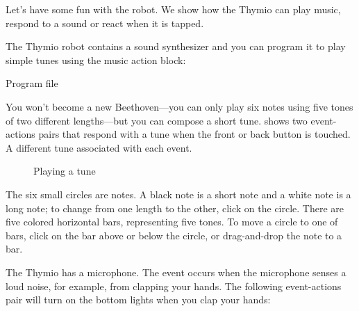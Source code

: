 \label{ch.bells}

Let's have some fun with the robot. We show how the Thymio can play
music, respond to a sound or react when it is tapped.


The Thymio robot contains a sound synthesizer and you can program it
to play simple tunes using the music action block: 

{\raggedleft \hfill Program file }

You won't become a new Beethoven---you can only play six notes using
five tones of two different lengths---but you can compose a short tune.
 shows two event-actions pairs that respond with a tune
when the front or back button is touched. A different tune associated
with each event.

\begin{figure}
\begin{center}
\caption{Playing a tune}\label{fig.music}
\end{center}
\end{figure}

The six small circles are notes. A black note is a short note and a
white note is a long note; to change from one length to the other, click
on the circle. There are five colored horizontal bars, representing five
tones. To move a circle to one of bars, click on the bar above or
below the circle, or drag-and-drop the note to a bar.




The Thymio has a microphone. The event  occurs
when the microphone senses a loud noise, for example, from clapping your
hands. The following event-actions pair will turn on the bottom lights
when you clap your hands:


\bigskip


